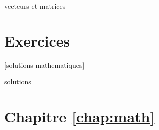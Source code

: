 vecteurs et matrices


\section{Exercices}
\label{sec:math:exercices}

[solutions-mathematiques]

\begin{Filesave}{solutions}
\section*{Chapitre \ref*{chap:math}}

\end{Filesave}




